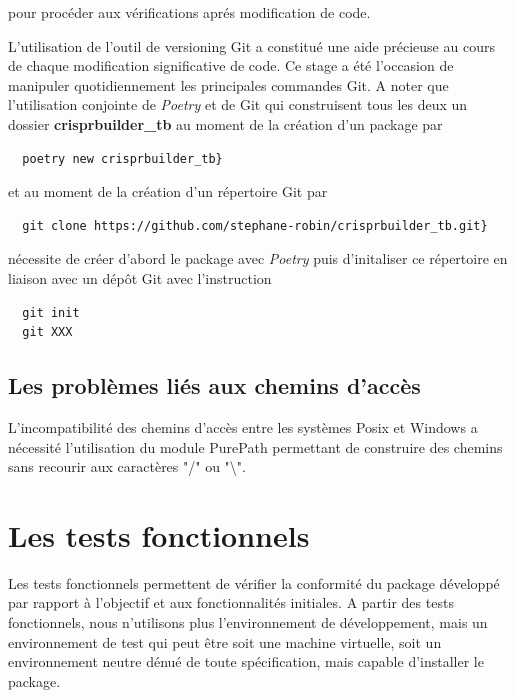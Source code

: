 \documentclass[twoside,a4paper,11pt,frenchb,openany]{report}
\begin{document}
pour procéder aux vérifications aprés modification de code.

L'utilisation de l'outil de versioning Git a constitué une aide précieuse au cours de chaque modification significative de code. Ce stage a été l'occasion de manipuler quotidiennement les principales commandes Git. A noter que l'utilisation conjointe de \textit{Poetry} et de Git qui construisent tous les deux un dossier \textbf{crisprbuilder\_tb} au moment de la création d'un package par

 \begin{verbatim}  poetry new crisprbuilder_tb}\end{verbatim}

et au moment de la création d'un répertoire Git par

\begin{verbatim}  git clone https://github.com/stephane-robin/crisprbuilder_tb.git}\end{verbatim}

nécessite de créer d'abord le package avec \textit{Poetry} puis d'initaliser ce répertoire en liaison avec un dépôt Git avec l'instruction

\begin{verbatim}
  git init
  git XXX
\end{verbatim} 


\subsection{Les problèmes liés aux chemins d'accès}

L'incompatibilité des chemins d'accès entre les systèmes Posix et Windows a nécessité l'utilisation du module PurePath permettant de construire des chemins sans recourir aux caractères "/" ou "\textbackslash".



\section{Les tests fonctionnels}

Les tests fonctionnels permettent de vérifier la conformité du package développé par rapport à l'objectif et aux fonctionnalités initiales. A partir des tests fonctionnels, nous n'utilisons plus l'environnement de développement, mais un environnement de test qui peut être soit une machine virtuelle, soit un environnement neutre dénué de toute spécification, mais capable d'installer le package.
\end{document}
